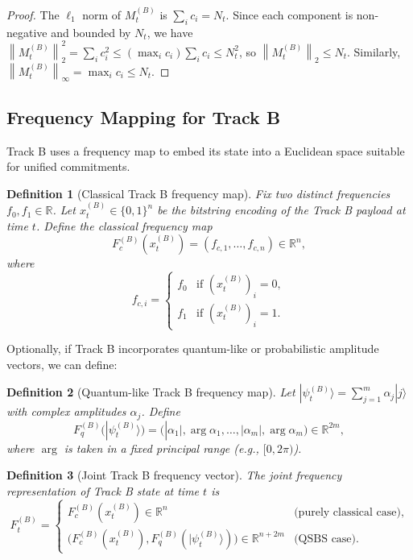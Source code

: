 \documentclass[11pt]{article}
\newtheorem{definition}{Definition}[section]
\newcommand{\R}{\mathbb{R}}
\newcommand{\norm}[1]{\left\lVert #1 \right\rVert}
\begin{document}
\begin{proof}
The \(\ell_1\) norm of \(M_t^{(B)}\) is \(\sum_i c_i = N_t\).
Since each component is non-negative and bounded by \(N_t\), we have
\(
\norm{M_t^{(B)}}_2^2 = \sum_i c_i^2 \le \left(\max_i c_i\right)\sum_i c_i \le N_t^2
\),
so \(\norm{M_t^{(B)}}_2 \le N_t\).
Similarly, \(\norm{M_t^{(B)}}_\infty = \max_i c_i \le N_t\).
\end{proof}

\subsection{Frequency Mapping for Track B}

Track B uses a frequency map to embed its state into a Euclidean space suitable for unified commitments.

\begin{definition}[Classical Track B frequency map]
Fix two distinct frequencies \(f_0, f_1 \in \R\).
Let \(x_t^{(B)} \in \{0,1\}^n\) be the bitstring encoding of the Track B payload at time \(t\).
Define the classical frequency map
\[
  F_c^{(B)}(x_t^{(B)}) = (f_{c,1}, \dots, f_{c,n}) \in \R^n,
\]
where
\[
  f_{c,i} =
  \begin{cases}
    f_0 & \text{if } (x_t^{(B)})_i = 0, \\
    f_1 & \text{if } (x_t^{(B)})_i = 1.
  \end{cases}
\]
\end{definition}

Optionally, if Track B incorporates quantum-like or probabilistic amplitude vectors, we can define:

\begin{definition}[Quantum-like Track B frequency map]
Let \(|\psi_t^{(B)}\rangle = \sum_{j=1}^m \alpha_j |j\rangle\) with complex amplitudes \(\alpha_j\).
Define
\[
  F_q^{(B)}(|\psi_t^{(B)}\rangle) = 
  \bigl(|\alpha_1|, \arg \alpha_1, \dots, |\alpha_m|, \arg \alpha_m\bigr) \in \R^{2m},
\]
where \(\arg\) is taken in a fixed principal range (e.g., \([0,2\pi)\)).
\end{definition}

\begin{definition}[Joint Track B frequency vector]
The joint frequency representation of Track B state at time \(t\) is
\[
  F_t^{(B)} =
  \begin{cases}
    F_c^{(B)}(x_t^{(B)}) \in \R^n & \text{(purely classical case)},\\[0.5em]
    \bigl(F_c^{(B)}(x_t^{(B)}), F_q^{(B)}(|\psi_t^{(B)}\rangle)\bigr) \in \R^{n+2m} & \text{(QSBS case)}.
  \end{cases}
\]
\end{definition}
\end{document}
